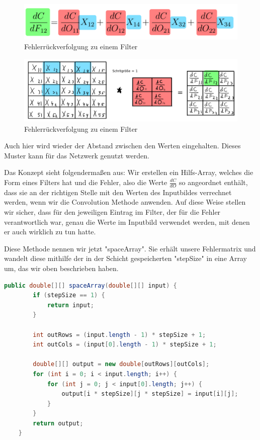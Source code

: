 \documentclass[12pt]{article}
\begin{document}

\begin{figure}[htp]
\centering
\includegraphics[scale=0.20]{Images/016_BackProp_Delta.png}
\caption{Fehlerrückverfolgung zu einem Filter}
\label{Fehlerrückverfolgung zu einem Filter v2}
\end{figure}

\begin{figure}[H]
\centering
\includegraphics[scale=0.35]{./Images/014_Backpropagation_Filter.png}
\caption{Fehlerrückverfolgung zu einem Filter}
\label{Fehlerrückverfolgung zu einem Filter v2}
\end{figure}

Auch hier wird wieder der Abstand zwischen den Werten eingehalten. Dieses Muster kann für das Netzwerk genutzt werden. 

Das Konzept sieht folgendermaßen aus: Wir erstellen ein Hilfs-Array, welches die Form eines Filters hat und die Fehler, also die Werte $\frac{dC} {dO}$ so angeordnet enthält, dass sie an der richtigen Stelle mit den Werten des Inputbildes verrechnet werden, wenn wir die Convolution Methode anwenden. Auf diese Weise stellen wir sicher, dass für den jeweiligen Eintrag im Filter, der für die Fehler verantwortlich war, genau die Werte im Inputbild verwendet werden, mit denen er auch wirklich zu tun hatte.

Diese Methode nennen wir jetzt "spaceArray". Sie erhält unsere Fehlermatrix und wandelt diese mithilfe der in der Schicht gespeicherten "stepSize" in eine Array um, das wir oben beschrieben haben.

\begin{lstlisting}[language=Java]
    public double[][] spaceArray(double[][] input) {
        if (stepSize == 1) {
            return input;
        }

        int outRows = (input.length - 1) * stepSize + 1;
        int outCols = (input[0].length - 1) * stepSize + 1;

        double[][] output = new double[outRows][outCols];
        for (int i = 0; i < input.length; i++) {
            for (int j = 0; j < input[0].length; j++) {
                output[i * stepSize][j * stepSize] = input[i][j];
            }
        }
        return output;
    }
\end{lstlisting}
\end{document}
